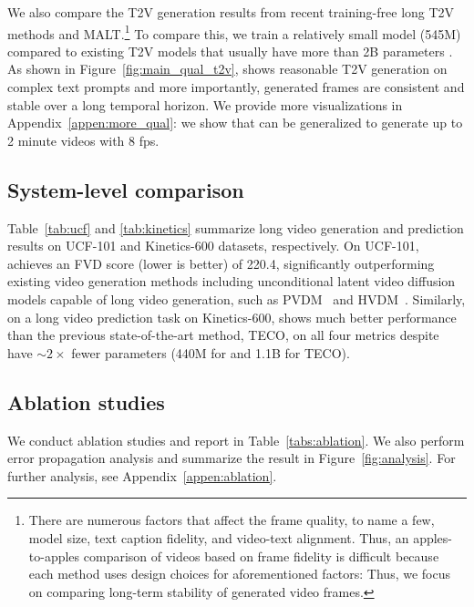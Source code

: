 We also compare the T2V generation results from recent training-free long T2V methods and MALT.\footnote{There are numerous factors that affect the frame quality, to name a few, model size, text caption fidelity, and video-text alignment. Thus, an apples-to-apples comparison of videos based on frame fidelity is difficult because each method uses design choices for aforementioned factors: Thus, we focus on comparing long-term stability of generated video frames.} 
To compare this, we train a relatively small model (545M) compared to existing T2V models that usually have more than 2B parameters \citep{blattmann2023align,gupta2023photorealistic,ho2022imagen}. 
As shown in Figure~\ref{fig:main_qual_t2v}, \sname shows reasonable T2V generation on complex text prompts and more importantly, generated frames are consistent and stable over a long temporal horizon. We provide more visualizations in Appendix~\ref{appen:more_qual}: we show that \sname can be generalized to generate up to 2 minute videos with 8 fps.



\subsection{System-level comparison}
Table~\ref{tab:ucf} and \ref{tab:kinetics} summarize long video generation and prediction results on UCF-101 and Kinetics-600 datasets, respectively. On UCF-101, \sname achieves an FVD score (lower is better) of 220.4, significantly outperforming existing video generation methods including unconditional latent video diffusion models capable of long video generation, such as PVDM~\citep{yu2023video} and HVDM~\citep{kim2024hybrid}. Similarly, on a long video prediction task on Kinetics-600, \sname shows much better performance than the previous state-of-the-art method, TECO, on all four metrics despite have $\sim 2\times $ fewer parameters (440M for \sname and 1.1B for TECO).



% 
% 
\subsection{Ablation studies}
\label{subsec:ablation}

We conduct ablation studies and report in Table~\ref{tabs:ablation}. We also perform error propagation analysis and summarize the result in Figure~\ref{fig:analysis}. For further analysis, see Appendix~\ref{appen:ablation}.

